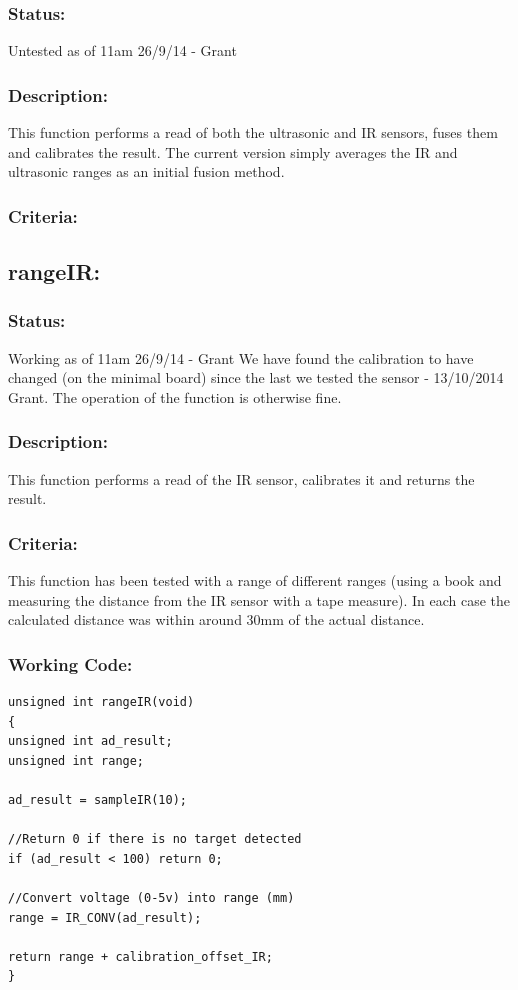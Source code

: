 \documentclass[]{report}
\begin{document}
\subsubsection{Status:}
Untested as of 11am 26/9/14 - Grant

\subsubsection{Description:}
This function performs a read of both the ultrasonic and IR sensors, fuses them and calibrates the result. The current version simply averages the IR and ultrasonic ranges as an initial fusion method.

\subsubsection{Criteria:}

\subsection{rangeIR:}
\subsubsection{Status:}
Working as of 11am 26/9/14 - Grant \newline
We have found the calibration to have changed (on the minimal board) since the last we tested the sensor - 13/10/2014 Grant. The operation of the function is otherwise fine.

\subsubsection{Description:}
This function performs a read of the IR sensor, calibrates it and returns the result.

\subsubsection{Criteria:}
This function has been tested with a range of different ranges (using a book and measuring the distance from the IR sensor with a tape measure). In each case the calculated distance was within around 30mm of the actual distance.

\subsubsection{Working Code:}
\begin{lstlisting}
unsigned int rangeIR(void)
{
unsigned int ad_result;
unsigned int range;

ad_result = sampleIR(10);

//Return 0 if there is no target detected
if (ad_result < 100) return 0;

//Convert voltage (0-5v) into range (mm)
range = IR_CONV(ad_result);

return range + calibration_offset_IR;
}
\end{lstlisting}
\end{document}
